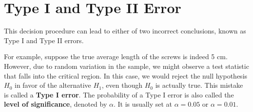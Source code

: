 \documentclass[twoside]{book}
\begin{document}
    



\section{Type I and Type II Error}
This decision procedure can lead to either of two incorrect conclusions, known as Type I and Type II errors.

For example, suppose the true average length of the screws is indeed 5 cm. However, due to random variation in the sample, we might observe a test statistic that falls into the critical region. In this case, we would reject the null hypothesis $H_0$ in favor of the alternative $H_1$, even though $H_0$ is actually true. This mistake is called a \textbf{Type I error}. The probability of a Type I error is also called the \textbf{level of significance}, denoted by $\alpha$. It is usually set at $\alpha = 0.05$ or $\alpha = 0.01$. 
\end{document}
